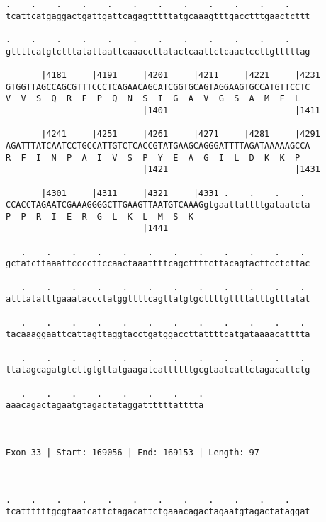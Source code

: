 \documentclass{article}
\begin{document}
\begin{Verbatim}
.    .    .    .    .    .    .    .    .    .    .    .    
tcattcatgaggactgattgattcagagtttttatgcaaagtttgacctttgaactcttt
                                                            
.    .    .    .    .    .    .    .    .    .    .    .    
gttttcatgtctttatattaattcaaaccttatactcaattctcaactccttgtttttag
                                                            
       |4181     |4191     |4201     |4211     |4221     |4231
GTGGTTAGCCAGCGTTTCCCTCAGAACAGCATCGGTGCAGTAGGAAGTGCCATGTTCCTC
V  V  S  Q  R  F  P  Q  N  S  I  G  A  V  G  S  A  M  F  L  
                           |1401                         |1411
  
       |4241     |4251     |4261     |4271     |4281     |4291
AGATTTATCAATCCTGCCATTGTCTCACCGTATGAAGCAGGGATTTTAGATAAAAAGCCA
R  F  I  N  P  A  I  V  S  P  Y  E  A  G  I  L  D  K  K  P  
                           |1421                         |1431
  
       |4301     |4311     |4321     |4331 .    .    .    . 
CCACCTAGAATCGAAAGGGGCTTGAAGTTAATGTCAAAGgtgaattattttgataatcta
P  P  R  I  E  R  G  L  K  L  M  S  K                       
                           |1441                            
  
   .    .    .    .    .    .    .    .    .    .    .    . 
gctatcttaaattccccttccaactaaattttcagcttttcttacagtacttcctcttac
                                                            
   .    .    .    .    .    .    .    .    .    .    .    . 
atttatatttgaaataccctatggttttcagttatgtgcttttgttttatttgtttatat
                                                            
   .    .    .    .    .    .    .    .    .    .    .    . 
tacaaaggaattcattagttaggtacctgatggaccttattttcatgataaaacatttta
                                                            
   .    .    .    .    .    .    .    .    .    .    .    . 
ttatagcagatgtcttgtgttatgaagatcattttttgcgtaatcattctagacattctg
                                                            
   .    .    .    .    .    .    .    .
aaacagactagaatgtagactataggattttttatttta
                                       
                                       
 
Exon 33 | Start: 169056 | End: 169153 | Length: 97



.    .    .    .    .    .    .    .    .    .    .    .    
tcattttttgcgtaatcattctagacattctgaaacagactagaatgtagactataggat
                                                            

\end{Verbatim}
\end{document}
